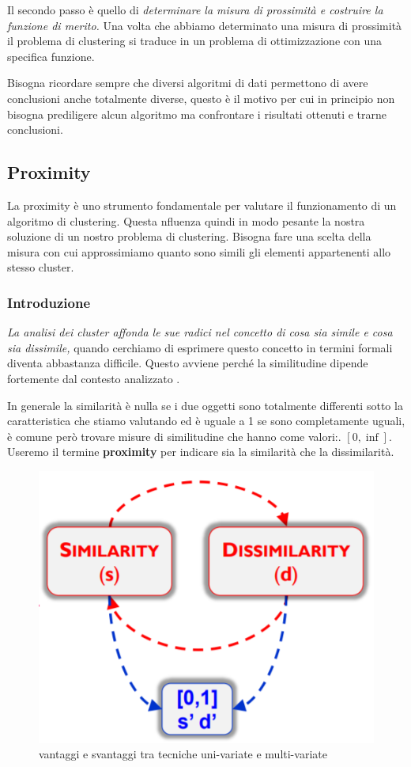 Il secondo passo è quello di \textit{determinare la misura di prossimità e costruire la funzione di merito.} Una volta che abbiamo determinato una misura di prossimità il problema di clustering si traduce in un problema di ottimizzazione con una specifica funzione.

Bisogna ricordare sempre che diversi algoritmi di dati permettono di avere conclusioni anche totalmente diverse, questo è il motivo per cui in principio non bisogna prediligere alcun algoritmo ma confrontare i risultati ottenuti e trarne conclusioni.


\subsection{ Proximity}

La proximity è uno strumento fondamentale per valutare il funzionamento di un algoritmo di clustering. Questa nfluenza quindi in modo pesante la nostra soluzione di un nostro problema di clustering. Bisogna fare una scelta della misura con cui approssimiamo quanto sono simili gli elementi appartenenti allo stesso cluster.
\subsubsection{Introduzione}
\textit{La analisi dei cluster affonda le sue radici nel concetto di cosa sia simile e cosa sia dissimile,} quando cerchiamo di esprimere questo concetto  in termini formali diventa abbastanza difficile. Questo avviene perché la similitudine dipende fortemente dal contesto analizzato .

In generale la similarità è nulla se i due oggetti sono totalmente differenti sotto la caratteristica che stiamo valutando ed è uguale a 1 se sono completamente uguali, è comune però trovare misure di similitudine che hanno come valori:.  $[0,\inf]$. Useremo il termine \textbf{proximity} per indicare sia la similarità che la dissimilarità. 

\begin{figure}[h!]
	\centering
	\includegraphics[height=0.45 \linewidth]{clustering/pict/simil_diss.png}
	\caption{vantaggi e svantaggi tra tecniche uni-variate e multi-variate}
\end{figure}

